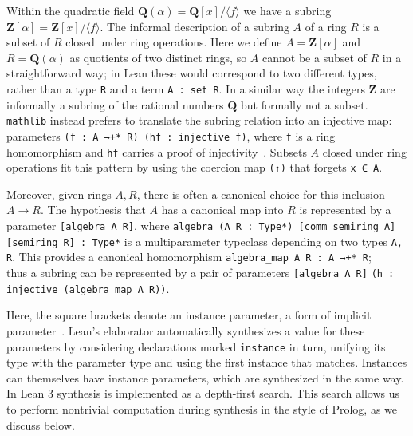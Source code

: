 \documentclass[sigplan,10pt,nonacm,
screen]{acmart} \settopmatter{printfolios=true,printccs=false,printacmref=false}
\newcommand{\mathlib}{\lstinline{mathlib}\xspace}
\newcommand{\QQ}{\mathbf{Q}}
\newcommand{\ZZ}{\mathbf{Z}}
\begin{document}
Within the quadratic field $\QQ(\alpha) = \QQ[x] / \langle f\rangle$ we have a subring $\ZZ[\alpha] = \ZZ[x] / \langle f\rangle$.
The informal description of a subring $A$ of a ring $R$ is a subset of $R$ closed under ring operations.
Here we define $A = \ZZ[\alpha]$ and $R = \QQ(\alpha)$ as quotients of two distinct rings, so $A$ cannot be a subset of $R$ in a straightforward way;
in Lean these would correspond to two different types, rather than a type \lstinline{R} and a term \lstinline{A : set R}.
In a similar way the integers $\ZZ$ are informally a subring of the rational numbers $\QQ$ but formally not a subset.
\mathlib instead prefers to translate the subring relation into an injective map: parameters \lstinline{(f : A →+* R) (hf : injective f)},
where \lstinline{f} is a ring homomorphism and \lstinline{hf} carries a proof of injectivity~\cite{baanen_formalization_2021}.
Subsets $A$ closed under ring operations fit this pattern by using the coercion map \lstinline{(↑)} that forgets \lstinline{x ∈ A}.

Moreover, given rings $A, R$, there is often a canonical choice for this inclusion $A \to R$.
The hypothesis that $A$ has a canonical map into $R$ is represented by a parameter \lstinline{[algebra A R]},
where \lstinline{algebra (A R : Type*) [comm_semiring A]} %
\lstinline{[semiring R] : Type*} is a multiparameter typeclass depending on two types \lstinline{A, R}.
This provides a canonical homomorphism \lstinline{algebra_map A R : A →+* R};\\ %
thus a subring can be represented by a pair of parameters \lstinline{[algebra A R]} \lstinline{(h : injective (algebra_map A R))}. %

Here, the square brackets denote an instance parameter, a form of implicit parameter~\cite{typeclasses}.
Lean's elaborator automatically synthesizes a value for these parameters by considering declarations marked \lstinline{instance} in turn,
unifying its type with the parameter type and using the first instance that matches.
Instances can themselves have instance parameters, which are synthesized in the same way.
In Lean 3 synthesis is implemented as a depth-first search.
This search allows us to perform nontrivial computation during synthesis in the style of Prolog, as we discuss below.
\end{document}
